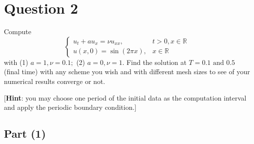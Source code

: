 \section{Question 2}

\begin{question}
    Compute $$\begin{cases}u_t+a u_x=\nu u_{x x}, & t>0, x \in \mathbb{R} \\ u(x, 0)=\sin (2 \pi x), & x \in \mathbb{R}\end{cases}$$ with (1) $a=1, \nu=0.1 ;$ (2) $a=0, \nu=1$. Find the solution at $T=0.1 \text{ and } 0.5$ (final time) with any scheme you wish and with different mesh sizes to see of your numerical results converge or not.
    
    [\textbf{Hint}: you may choose one period of the initial data as the computation interval and apply the periodic boundary condition.]
\end{question}

\subsection{Part (1)}

